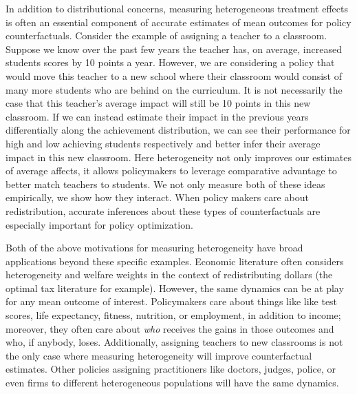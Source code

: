 \documentclass[12pt]{article}
\theoremstyle{definition}
\theoremstyle{definition}
\theoremstyle{definition}
\theoremstyle{definition}
\begin{document}
    In addition to distributional concerns, measuring heterogeneous treatment effects is often an essential component of accurate estimates of mean outcomes for policy counterfactuals. Consider the example of assigning a teacher to a classroom. Suppose we know over the past few years the teacher has, on average, increased students scores by 10 points a year. However, we are considering a policy that would move this teacher to a new school where their classroom would consist of many more students who are behind on the curriculum. It is not necessarily the case that this teacher's average impact will still be 10 points in this new classroom. If we can instead estimate their impact in the previous years differentially along the achievement distribution, we can see their performance for high and low achieving students respectively and better infer their average impact in this new classroom. Here heterogeneity not only improves our estimates of average affects, it allows policymakers to leverage comparative advantage to better match teachers to students. We not only measure both of these ideas empirically, we show how they interact. When policy makers care about redistribution, accurate inferences about these types of counterfactuals are especially important for policy optimization.  

    Both of the above motivations for measuring heterogeneity have broad applications beyond these specific examples. Economic literature often considers heterogeneity and welfare weights in the context of redistributing dollars (the optimal tax literature for example). However, the same dynamics can be at play for any mean outcome of interest. Policymakers care about things like like test scores, life expectancy, fitness, nutrition, or employment, in addition to income; moreover, they often care about \emph{who} receives the gains in those outcomes and who, if anybody, loses. Additionally, assigning teachers to new classrooms is not the only case where measuring heterogeneity will improve counterfactual estimates. Other policies assigning practitioners like doctors, judges, police, or even firms to different heterogeneous populations will have the same dynamics.
    
    
    
\end{document}
